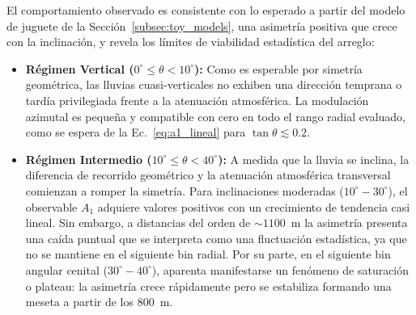 {\color{blue}El comportamiento observado es consistente con lo esperado a partir del modelo de juguete de la Sección~\ref{subsec:toy_models}, una asimetría positiva que crece con la inclinación, y revela los límites de viabilidad estadística del arreglo:}

\begin{itemize}
	\item \textbf{Régimen Vertical ($0^\circ \leq \theta < 10^\circ$):} Como es esperable por simetría geométrica, las lluvias cuasi-verticales no exhiben una dirección temprana o tardía privilegiada frente a la atenuación atmosférica. %
{\color{blue}La modulación azimutal es pequeña y compatible con cero en todo el rango radial evaluado, como se espera de la Ec.~\ref{eq:a1_lineal} para $\tan\theta \lesssim 0.2$.}
	
	\item \textbf{Régimen Intermedio ($10^\circ \leq \theta < 40^\circ$):} A medida que la lluvia se inclina, la diferencia de recorrido geométrico y la atenuación atmosférica transversal comienzan a romper la simetría. Para inclinaciones moderadas ($10^\circ - 30^\circ$), el observable $A_1$ adquiere valores positivos con un crecimiento de tendencia casi lineal. %
{\color{blue}Sin embargo, a distancias del orden de $\sim 1100$~m la asimetría presenta una caída puntual que se interpreta como una fluctuación estadística, ya que no se mantiene en el siguiente bin radial.} Por su parte, en el siguiente bin angular cenital ($30^\circ - 40^\circ$), aparenta manifestarse un fenómeno de saturación o plateau: la asimetría crece rápidamente pero se estabiliza formando una meseta a partir de los $800$~m.
	

\end{itemize}
